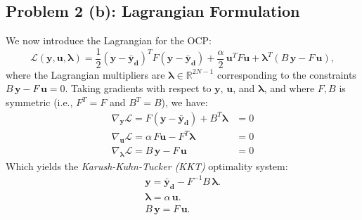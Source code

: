 \documentclass[a4paper,10pt]{article}
\begin{document}
\subsection*{Problem 2 (b): Lagrangian Formulation}

We now introduce the Lagrangian for the OCP:
\[
	\mathcal{L}(\mathbf{y},\mathbf{u},\symbf{\lambda}) = \frac{1}{2}(\mathbf{y}-\mathbf{\bar{y}_d})^T F (\mathbf{y}-\mathbf{\bar{y}_d}) + \frac{\alpha}{2}\, \mathbf{u}^T F \mathbf{u} + \symbf{\lambda}^T (B\,\mathbf{y} - F\,\mathbf{u}),
\]
where the Lagrangian multipliers are \(\symbf{\lambda} \in \mathbb{R}^{2N-1}\) corresponding to the constraints \(B\,\mathbf{y} - F\,\mathbf{u} = 0\).
Taking gradients with respect to \(\mathbf{y}\), \(\mathbf{u}\), and \(\symbf{\lambda}\), and where \(F, B\) is symmetric (i.e., \(F^T = F\) and \(B^T = B\)), we have:
\begin{align*}
	\nabla_{\mathbf{y}}\mathcal{L} = F(\mathbf{y}-\mathbf{\bar{y}_d}) + B^T\symbf{\lambda} & = 0 \\
	\nabla_{\mathbf{u}}\mathcal{L} = \alpha\,F\mathbf{u} - F^T\symbf{\lambda}      & = 0 \\
	\nabla_{\symbf{\lambda}}\mathcal{L} = B\,\mathbf{y} - F\,\mathbf{u}            & = 0
\end{align*}
Which yields the \emph{Karush-Kuhn-Tucker (KKT)} optimality system:
\begin{align*}
	\mathbf{y} = \mathbf{\bar{y}_d} - F^{-1}B\,\symbf{\lambda}. \tag{1} \label{eq:grad_y} \\
	\symbf{\lambda} = \alpha\,\mathbf{u}. \tag{2} \label{eq:grad_u}               \\
	B\,\mathbf{y} = F\,\mathbf{u}. \tag{3} \label{eq:grad_lambda}
\end{align*}
\end{document}
